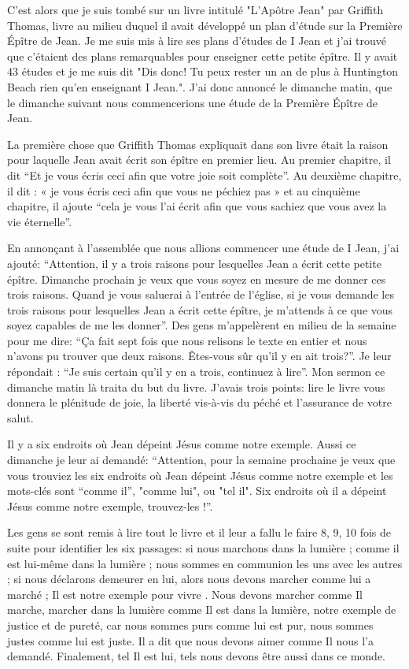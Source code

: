 C’est alors que je suis tombé sur un livre intitulé "L’Apôtre Jean" par Griffith Thomas, livre au milieu duquel il avait
développé un plan d’étude sur la Première Épître de Jean. Je me suis mis à lire ses plans d’études de I Jean et j'ai
trouvé que c’étaient des plans remarquables pour enseigner cette petite épître. Il y avait 43 études et je me suis dit
"Dis donc! Tu peux rester un an de plus à Huntington Beach rien qu’en enseignant I Jean.". J'ai donc annoncé le
dimanche matin, que le dimanche suivant nous commencerions une étude de la Première Épître de Jean.

La première chose que Griffith Thomas expliquait dans son livre était la raison pour laquelle Jean avait écrit son
épître en premier lieu. Au premier chapitre, il dit “Et je vous écris ceci afin que votre joie soit complète”. Au deuxième
chapitre, il dit : « je vous écris ceci afin que vous ne péchiez pas » et au cinquième chapitre, il ajoute “cela je vous l’ai
écrit afin que vous sachiez que vous avez la vie éternelle”.

En annonçant à l'assemblée que nous allions commencer une étude de I Jean, j'ai ajouté: “Attention, il y a trois
raisons pour lesquelles Jean a écrit cette petite épître. Dimanche prochain je veux que vous soyez en mesure de me
donner ces trois raisons. Quand je vous saluerai à l’entrée de l’église, si je vous demande les trois raisons pour
lesquelles Jean a écrit cette épître, je m’attends à ce que vous soyez capables de me les donner”. Des gens
m’appelèrent en milieu de la semaine pour me dire: “Ça fait sept fois que nous relisons le texte en entier et nous
n'avons pu trouver que deux raisons. Êtes-vous sûr qu’il y en ait trois?”. Je leur répondait : “Je suis certain qu’il y en a
trois, continuez à lire”. Mon sermon ce dimanche matin là traita du but du livre. J’avais trois points: lire le livre vous
donnera le plénitude de joie, la liberté vis-à-vis du péché et l’assurance de votre salut.

Il y a six endroits où Jean dépeint Jésus comme notre exemple. Aussi ce dimanche je leur ai demandé: “Attention,
pour la semaine prochaine je veux que vous trouviez les six endroits où Jean dépeint Jésus comme notre exemple et
les mots-clés sont “comme il”, "comme lui", ou "tel il". Six endroits où il a dépeint Jésus comme notre exemple,
trouvez-les !”.

Les gens se sont remis à lire tout le livre et il leur a fallu le faire 8, 9, 10 fois de suite pour identifier les six passages:
si nous marchons dans la lumière ; comme il est lui-même dans la lumière ; nous sommes en communion les uns
avec les autres ; si nous déclarons demeurer en lui, alors nous devons marcher comme lui a marché ; Il est notre
exemple pour vivre . Nous devons marcher comme Il marche, marcher dans la lumière comme Il est dans la lumière,
notre exemple de justice et de pureté, car nous sommes purs comme lui est pur, nous sommes justes comme lui est
juste. Il a dit que nous devons aimer comme Il nous l’a demandé. Finalement, tel Il est lui, tels nous devons être
aussi dans ce monde.

